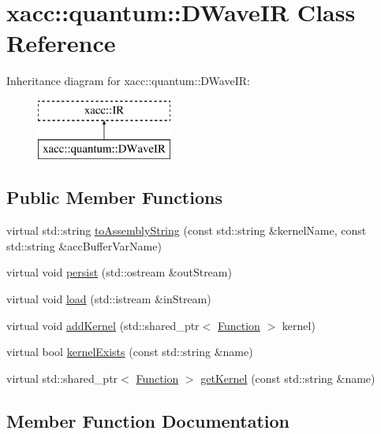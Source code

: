 \hypertarget{a00025}{}\section{xacc\+:\+:quantum\+:\+:D\+Wave\+IR Class Reference}
\label{a00025}
Inheritance diagram for xacc\+:\+:quantum\+:\+:D\+Wave\+IR\+:\begin{figure}[H]
\begin{center}
\leavevmode
\includegraphics[height=2.000000cm]{a00025}
\end{center}
\end{figure}
\subsection*{Public Member Functions}
\begin{DoxyCompactItemize}
\item 
virtual std\+::string \hyperlink{a00025_ac19ad098d5bbfe769809c10e26ebebc6}{to\+Assembly\+String} (const std\+::string \&kernel\+Name, const std\+::string \&acc\+Buffer\+Var\+Name)
\item 
virtual void \hyperlink{a00025_adac268c6fa2234902efeb9b3c07c0ac2}{persist} (std\+::ostream \&out\+Stream)
\item 
virtual void \hyperlink{a00025_a94d814172ec30c7ed32e6ab52bc2a41a}{load} (std\+::istream \&in\+Stream)
\item 
virtual void \hyperlink{a00025_a7e1ddff2771233dc45f60a6b7e15ef63}{add\+Kernel} (std\+::shared\+\_\+ptr$<$ \hyperlink{a00030}{Function} $>$ kernel)
\item 
virtual bool \hyperlink{a00025_ace9b8c6f4f29e32c8482fec4eacb637a}{kernel\+Exists} (const std\+::string \&name)
\item 
virtual std\+::shared\+\_\+ptr$<$ \hyperlink{a00030}{Function} $>$ \hyperlink{a00025_ac4295dfef98c94d7154a4fd39a6e5d1c}{get\+Kernel} (const std\+::string \&name)
\end{DoxyCompactItemize}


\subsection{Member Function Documentation}

